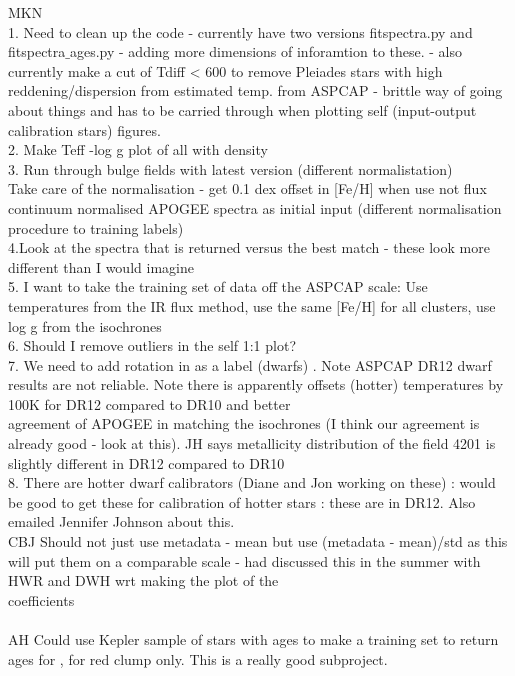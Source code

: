 \documentclass[12pt, preprint]{aastex}
\begin{document}
MKN \\
1. Need to clean up the code  - currently have two versions fitspectra.py and fitspectra$\_$ages.py - adding more dimensions of inforamtion to these.
- also currently make a cut of Tdiff < 600 to remove Pleiades stars with high reddening/dispersion from estimated temp. from ASPCAP - brittle way of going about things and has to be carried through
when plotting self (input-output calibration stars) figures.\\
2. Make Teff -log g plot of all with density\\
3. Run through bulge fields with latest version (different normalistation)\\
Take care of the normalisation - get 0.1 dex offset in [Fe/H] when use not flux continuum normalised APOGEE spectra as initial input (different normalisation procedure to training labels)\\
4.Look at the spectra that is returned versus the best match - these look more different than I would imagine\\
5. I want to take the training set of data off the ASPCAP scale: Use temperatures from the IR flux method, use the same [Fe/H] for all clusters, use log g from the isochrones\\
6. Should I remove outliers in the self 1:1 plot?\\
7. We need to add rotation in as a label (dwarfs) . Note ASPCAP DR12 dwarf results are not reliable. Note there is apparently offsets (hotter) temperatures by 100K for DR12 compared to DR10 and better\\
agreement of APOGEE in matching the isochrones (I think our agreement is already good - look at this). JH says metallicity distribution of the field 4201 is slightly different in DR12 compared to DR10\\
8. There are hotter dwarf calibrators (Diane and Jon working on these) : would be good to get these for calibration of hotter stars : these are in DR12. Also emailed Jennifer Johnson about this.\\

CBJ
Should not just use metadata - mean but use (metadata - mean)/std as this will put them on a comparable scale - had discussed this in the summer with HWR and DWH wrt making the plot of the\\
coefficients\\
\\
AH
Could use Kepler sample of stars with ages to make a training set to return ages for , for red clump only. This is a really good subproject.\\
\end{document}
